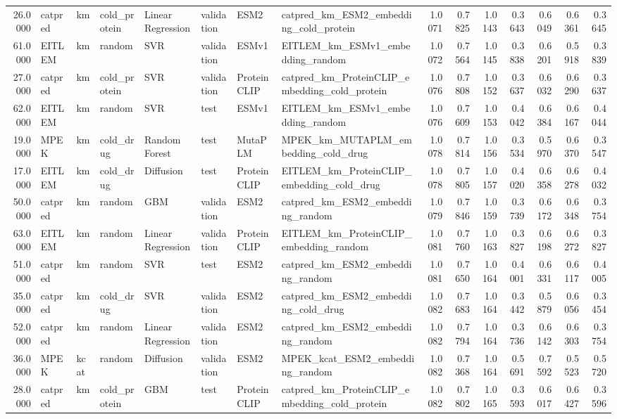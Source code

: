\begin{tabular}{rlllllllrrrrrrr}
26.0000 & catpred & km & cold_protein & Linear Regression & validation & ESM2 & catpred_km_ESM2_embedding_cold_protein & 1.0071 & 0.7825 & 1.0143 & 0.3643 & 0.6049 & 0.6361 & 0.3645 \\
61.0000 & EITLEM & km & random & SVR & validation & ESMv1 & EITLEM_km_ESMv1_embedding_random & 1.0072 & 0.7564 & 1.0145 & 0.3838 & 0.6201 & 0.5918 & 0.3839 \\
27.0000 & catpred & km & cold_protein & SVR & validation & ProteinCLIP & catpred_km_ProteinCLIP_embedding_cold_protein & 1.0076 & 0.7808 & 1.0152 & 0.3637 & 0.6032 & 0.6290 & 0.3637 \\
62.0000 & EITLEM & km & random & SVR & test & ESMv1 & EITLEM_km_ESMv1_embedding_random & 1.0076 & 0.7609 & 1.0153 & 0.4042 & 0.6384 & 0.6167 & 0.4044 \\
19.0000 & MPEK & km & cold_drug & Random Forest & test & MutaPLM & MPEK_km_MUTAPLM_embedding_cold_drug & 1.0078 & 0.7814 & 1.0156 & 0.3534 & 0.5970 & 0.6370 & 0.3547 \\
17.0000 & EITLEM & km & cold_drug & Diffusion & test & ProteinCLIP & EITLEM_km_ProteinCLIP_embedding_cold_drug & 1.0078 & 0.7805 & 1.0157 & 0.4020 & 0.6358 & 0.6278 & 0.4032 \\
50.0000 & catpred & km & random & GBM & validation & ESM2 & catpred_km_ESM2_embedding_random & 1.0079 & 0.7846 & 1.0159 & 0.3739 & 0.6172 & 0.6348 & 0.3754 \\
63.0000 & EITLEM & km & random & Linear Regression & validation & ProteinCLIP & EITLEM_km_ProteinCLIP_embedding_random & 1.0081 & 0.7760 & 1.0163 & 0.3827 & 0.6198 & 0.6272 & 0.3827 \\
51.0000 & catpred & km & random & SVR & test & ESM2 & catpred_km_ESM2_embedding_random & 1.0081 & 0.7650 & 1.0164 & 0.4001 & 0.6331 & 0.6117 & 0.4005 \\
35.0000 & catpred & km & cold_drug & SVR & validation & ESM2 & catpred_km_ESM2_embedding_cold_drug & 1.0082 & 0.7683 & 1.0164 & 0.3442 & 0.5879 & 0.6056 & 0.3454 \\
52.0000 & catpred & km & random & Linear Regression & validation & ESM2 & catpred_km_ESM2_embedding_random & 1.0082 & 0.7794 & 1.0164 & 0.3736 & 0.6142 & 0.6303 & 0.3754 \\
36.0000 & MPEK & kcat & random & Diffusion & validation & ESM2 & MPEK_kcat_ESM2_embedding_random & 1.0082 & 0.7368 & 1.0164 & 0.5691 & 0.7592 & 0.5523 & 0.5720 \\
28.0000 & catpred & km & cold_protein & GBM & test & ProteinCLIP & catpred_km_ProteinCLIP_embedding_cold_protein & 1.0082 & 0.7802 & 1.0165 & 0.3593 & 0.6017 & 0.6427 & 0.3596 \\

\end{tabular}
